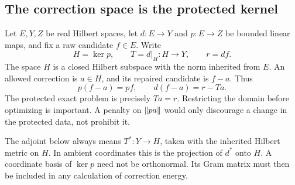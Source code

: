 \subsection{The correction space is the protected kernel}
Let $E,Y,Z$ be real Hilbert spaces, let $d:E\to Y$ and $p:E\to Z$ be bounded linear maps, and fix a raw candidate $f\in E$. Write
\[
 H=\ker p,\qquad T=d|_H:H\to Y,\qquad r=df.
\]
The space $H$ is a closed Hilbert subspace with the norm inherited from $E$. An allowed correction is $a\in H$, and its repaired candidate is $f-a$. Thus
\[
 p(f-a)=pf,\qquad d(f-a)=r-Ta.
\]
The protected exact problem is precisely $Ta=r$. Restricting the domain before optimizing is important. A penalty on $\left\lVert pa\right\rVert$ would only discourage a change in the protected data, not prohibit it.

The adjoint below always means $T^*:Y\to H$, taken with the inherited Hilbert metric on $H$. In ambient coordinates this is the projection of $d^*$ onto $H$. A coordinate basis of $\ker p$ need not be orthonormal. Its Gram matrix must then be included in any calculation of correction energy.

